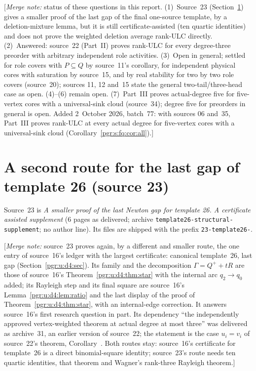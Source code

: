\documentclass[11pt]{article}
\makeatletter
\numberwithin{equation}{section}
\theoremstyle{definition}\newtheorem{definition}[theorem]{Definition}\newtheorem{remark}[theorem]{Remark}
\newcommand{\Ga}{\Gamma}                   %
\newcommand{\Qp}{Q^{+}}                    %
\newcommand{\mnote}[1]{[\textit{Merge note:} #1]}
\newcommand{\pgrfwd}[2]{\@ifundefined{r@#1}{#2}{\ref{#1}}}
\makeatother
\begin{document}
\mnote{status of these questions in this report. (1)~Source~23
(Section~\ref{pgr:u:t26:sec}) gives a smaller proof of the last gap of the
final one-source template, by a deletion-mixture lemma, but it is still
certificate-assisted (ten quartic identities) and does not prove the
weighted deletion average rank-ULC directly. (2)~Answered: source~22
(Part~II) proves rank-ULC for every degree-three preorder with arbitrary
independent role activities. (3)~Open in general; settled for role covers
with $P\subseteq Q$ by source~11's corollary, for independent physical
cores with saturation by source~15, and by real stability for two by two
role covers (source~20); sources 11, 12 and~15 state the general
two-tail/three-head case as open. (4)--(6) remain open. (7)~Part~III proves
actual-degree five for five-vertex cores with a universal-sink cloud
(source~34); degree five for preorders in general is open.
Added 2~October 2026, batch~77: with sources 06 and~35, Part~III proves
rank-ULC at every actual degree for five-vertex cores with a
universal-sink cloud (Corollary~\ref{pgr:s:fq:cor:all}).}



\section{A second route for the last gap of template 26 (source 23)}\label{pgr:u:t26:sec}

Source~23 is \emph{A smaller proof of the last Newton gap for template 26.
A certificate assisted supplement} (6 pages as delivered; archive
\texttt{template26-structural-supplement}; no author line). Its files are
shipped with the prefix \texttt{23-template26-}.

\mnote{source~23 proves again, by a different and smaller route, the one
entry of source~16's ledger with the largest certificate: canonical
template~26, last gap (Section~\ref{pgr:u:d4:sec}). Its family and the
decomposition $\Ga=\Qp+tR$ are those of source~16's
Theorem~\ref{pgr:u:d4:thm:star} with the internal arc $q_2\to q_0$ added;
its Rayleigh step and its final square are source~16's
Lemma~\ref{pgr:u:d4:lem:ratio} and the last display of the proof of
Theorem~\ref{pgr:u:d4:thm:star}, with an internal-edge correction. It
answers source~16's first research question in part. Its dependency
``the independently approved vertex-weighted theorem at actual degree at
most three'' was delivered as archive~31, an earlier version of source~22;
the statement is the case $u_i=v_i$ of source~22's theorem,
Corollary~\pgrfwd{pgr:r:ir:cor:vertex}{of source~22 in Part~II}. Both
routes stay: source~16's certificate for template~26 is a direct
binomial-square identity; source~23's route needs ten quartic identities,
that theorem and Wagner's rank-three Rayleigh theorem.}
\end{document}

